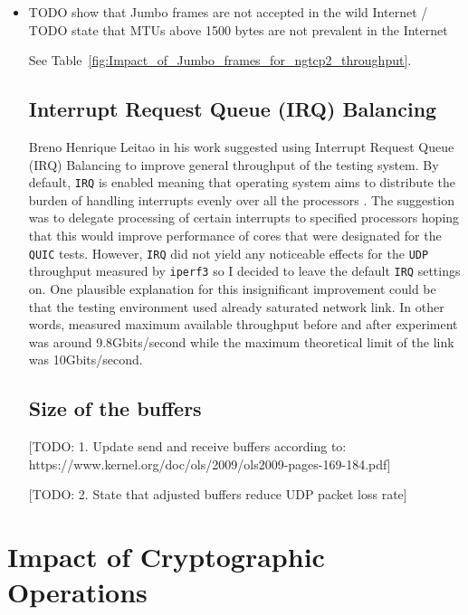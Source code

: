 \documentclass[12pt,a4paper,twoside,openright]{report}
\begin{document}
\begin{itemize}
  
  \item TODO show that Jumbo frames are not accepted in the wild Internet / TODO state that MTUs above 1500 bytes are not prevalent in the Internet
  
  
  See Table~\ref{fig:Impact_of_Jumbo_frames_for_ngtcp2_throughput}.
  
  
\subsection{Interrupt Request Queue (IRQ) Balancing} 
Breno Henrique Leitao in his work suggested using \cite{Tuning_10Gb_network_cards_on_Linux} Interrupt Request Queue (IRQ) Balancing to improve general throughput of the testing system.
By default, \texttt{IRQ} is enabled meaning that operating system aims to distribute the burden of handling interrupts evenly over all the processors \cite{Tuning_10Gb_network_cards_on_Linux}.
The suggestion was to delegate processing of certain interrupts to specified processors hoping that this would improve performance of cores that were designated for the \texttt{QUIC} tests.
However, \texttt{IRQ} did not yield any noticeable effects for the \texttt{UDP} throughput measured by \texttt{iperf3} so I decided to leave the default \texttt{IRQ} settings on.
One plausible explanation for this insignificant improvement could be that the testing environment used already saturated network link.
In other words, measured maximum available throughput before and after experiment was around 9.8Gbits/second while the maximum theoretical limit of the link was 10Gbits/second. 


\subsection{Size of the buffers} 

[TODO: 1. Update send and receive buffers according to: https://www.kernel.org/doc/ols/2009/ols2009-pages-169-184.pdf]  

[TODO: 2. State that adjusted buffers reduce UDP packet loss rate] 
 
 
  
\end{itemize}






\section{Impact of Cryptographic Operations}
\end{document}
